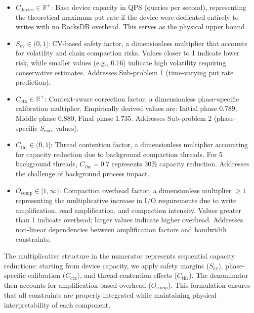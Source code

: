 \documentclass[11pt]{article}
\begin{document}
\begin{itemize}
    \item $C_{\text{device}} \in \mathbb{R}^+$: Base device capacity in QPS (queries per second), representing the theoretical maximum put rate if the device were dedicated entirely to writes with no RocksDB overhead. This serves as the physical upper bound.
    
    \item $S_{\text{cv}} \in (0, 1]$: CV-based safety factor, a dimensionless multiplier that accounts for volatility and chain compaction risks. Values closer to 1 indicate lower risk, while smaller values (e.g., 0.16) indicate high volatility requiring conservative estimates. Addresses Sub-problem 1 (time-varying put rate prediction).
    
    \item $C_{\text{ctx}} \in \mathbb{R}^+$: Context-aware correction factor, a dimensionless phase-specific calibration multiplier. Empirically derived values are: Initial phase 0.789, Middle phase 0.880, Final phase 1.735. Addresses Sub-problem 2 (phase-specific $S_{\max}$ values).
    
    \item $C_{\text{thr}} \in (0, 1]$: Thread contention factor, a dimensionless multiplier accounting for capacity reduction due to background compaction threads. For 5 background threads, $C_{\text{thr}} = 0.7$ represents 30\% capacity reduction. Addresses the challenge of background process impact.
    
    \item $O_{\text{comp}} \in [1, \infty)$: Compaction overhead factor, a dimensionless multiplier $\geq 1$ representing the multiplicative increase in I/O requirements due to write amplification, read amplification, and compaction intensity. Values greater than 1 indicate overhead; larger values indicate higher overhead. Addresses non-linear dependencies between amplification factors and bandwidth constraints.
\end{itemize}

The multiplicative structure in the numerator represents sequential capacity reductions: starting from device capacity, we apply safety margins ($S_{\text{cv}}$), phase-specific calibration ($C_{\text{ctx}}$), and thread contention effects ($C_{\text{thr}}$). The denominator then accounts for amplification-based overhead ($O_{\text{comp}}$). This formulation ensures that all constraints are properly integrated while maintaining physical interpretability of each component.
\end{document}
